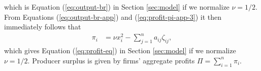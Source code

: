 which is Equation (\ref{eq:output-br}) in Section \ref{sec:model} if we normalize  $\nu=1/2$. From Equations (\ref{eq:output-br-app}) and (\ref{eq:profit-pi-app-3}) it then immediately follows that
\begin{align*}
\pi_i 
& = \nu x_i^2  - \sum_{j=1}^n a_{ij}\zeta_{ij},
\end{align*}
which gives Equation (\ref{eq:profit-eq}) in Section \ref{sec:model} if we normalize  $\nu=1/2$. Producer surplus is given by firms' aggregate profits $\Pi = \sum_{i=1}^n \pi_i$.

